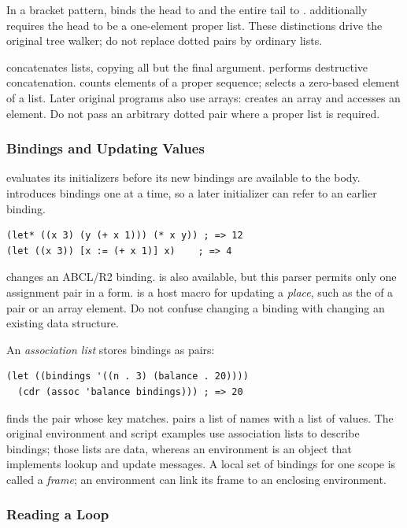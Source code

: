 In a bracket pattern, \code{[A . B]} binds the head to  and
the entire tail to . \code{[[A] . B]} additionally requires
the head to be a one-element proper list. These distinctions drive the
original tree walker; do not replace dotted pairs by ordinary lists.

 concatenates lists, copying all but the final argument.
 performs destructive concatenation.
 counts elements of a proper sequence;  selects
a zero-based element of a list. Later original programs also use arrays:
 creates an array and  accesses an element.
Do not pass an arbitrary dotted pair where a proper list is required.

\subsubsection{Bindings and Updating Values}

 evaluates its initializers before its new bindings are available
to the body.  introduces bindings one at a time, so a later
initializer can refer to an earlier binding.
\begin{lstlisting}
(let* ((x 3) (y (+ x 1))) (* x y)) ; => 12
(let ((x 3)) [x := (+ x 1)] x)    ; => 4
\end{lstlisting}
\code{[x := value]} changes an ABCL/R2 binding.
 is also available, but this parser permits only one assignment
pair in a  form.
 is a host macro for updating a \emph{place}, such as the
 of a pair or an array element. Do not confuse changing a binding
with changing an existing data structure.

An \emph{association list} stores bindings as pairs:
\begin{lstlisting}
(let ((bindings '((n . 3) (balance . 20))))
  (cdr (assoc 'balance bindings))) ; => 20
\end{lstlisting}
 finds the pair whose key matches.
 pairs a list of names with a list of values.
The original environment and script examples use association lists to
describe bindings; those lists are data, whereas an environment is an
object that implements lookup and update messages.
A local set of bindings for one scope is called a \emph{frame}; an
environment can link its frame to an enclosing environment.

\subsubsection{Reading a Loop}

